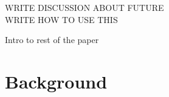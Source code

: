 \documentclass[conference]{IEEEtran}
\begin{document}
WRITE DISCUSSION ABOUT FUTURE
\\WRITE HOW TO USE THIS

Intro to rest of the paper


 
\section{Background}
\end{document}
